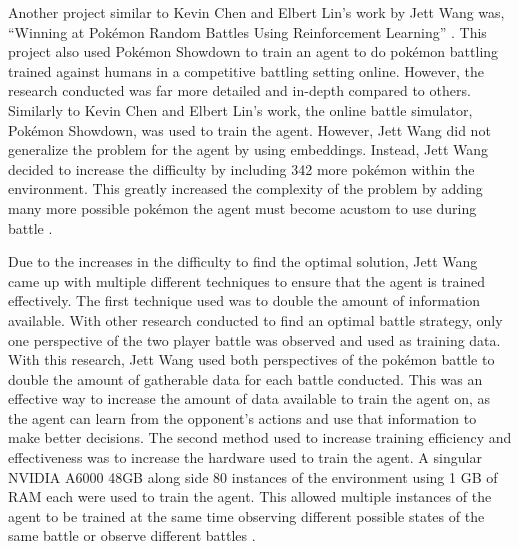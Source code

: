Another project similar to Kevin Chen and Elbert Lin's work by Jett Wang was, ``Winning at Pokémon Random Battles Using Reinforcement Learning'' \cite{wang2020winning}. This project also used Pokémon Showdown to train an agent to do pokémon battling trained against humans in a competitive battling setting online. However, the research conducted was far more detailed and in-depth compared to others. Similarly to Kevin Chen and Elbert Lin's work, the online battle simulator, Pokémon Showdown, was used to train the agent. However, Jett Wang did not generalize the problem for the agent by using embeddings. Instead, Jett Wang decided to increase the difficulty by including 342 more pokémon within the environment. This greatly increased the complexity of the problem by adding many more possible pokémon the agent must become acustom to use during battle \cite{wang2020winning}. 

Due to the increases in the difficulty to find the optimal solution, Jett Wang came up with multiple different techniques to ensure that the agent is trained effectively. The first technique used was to double the amount of information available. With other research conducted to find an optimal battle strategy, only one perspective of the two player battle was observed and used as training data. With this research, Jett Wang used both perspectives of the pokémon battle to double the amount of gatherable data for each battle conducted. This was an effective way to increase the amount of data available to train the agent on, as the agent can learn from the opponent's actions and use that information to make better decisions. The second method used to increase training efficiency and effectiveness was to increase the hardware used to train the agent. A singular NVIDIA A6000 48GB along side 80 instances of the environment using 1 GB of RAM each were used to train the agent. This allowed multiple instances of the agent to be trained at the same time observing different possible states of the same battle or observe different battles \cite{wang2020winning}. 
 

